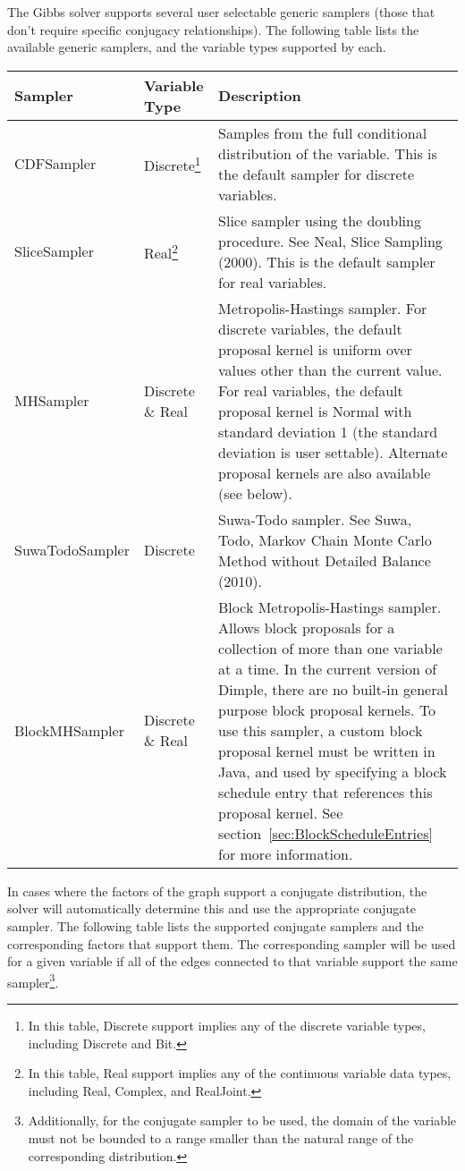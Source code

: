 The Gibbs solver supports several user selectable generic samplers (those that don't require specific conjugacy relationships).  The following table lists the available generic samplers, and the variable types supported by each.

\begin{longtable} {l l p{8.0cm}}
Sampler & Variable Type &  Description \\
\hline
\endhead
CDFSampler & Discrete\footnote{In this table, Discrete support implies any of the discrete variable types, including Discrete and Bit.} & Samples from the full conditional distribution of the variable.  This is the default sampler for discrete variables. \\
SliceSampler & Real\footnote{In this table, Real support implies any of the continuous variable data types, including Real, Complex, and RealJoint.} & Slice sampler using the doubling procedure.  See Neal, Slice Sampling (2000).  This is the default sampler for real variables. \\
MHSampler & Discrete \& Real & Metropolis-Hastings sampler.  For discrete variables, the default proposal kernel is uniform over values other than the current value.  For real variables, the default proposal kernel is Normal with standard deviation 1 (the standard deviation is user settable).  Alternate proposal kernels are also available (see below). \\
SuwaTodoSampler & Discrete & Suwa-Todo sampler.  See Suwa, Todo, Markov Chain Monte Carlo Method without Detailed Balance (2010). \\
BlockMHSampler & Discrete \& Real & Block Metropolis-Hastings sampler.  Allows block proposals for a collection of more than one variable at a time.  In the current version of Dimple, there are no built-in general purpose block proposal kernels.  To use this sampler, a custom block proposal kernel must be written in Java, and used by specifying a block schedule entry that references this proposal kernel.  See section~\ref{sec:BlockScheduleEntries} for more information.
\end{longtable}


In cases where the factors of the graph support a conjugate distribution, the solver will automatically determine this and use the appropriate conjugate sampler.  The following table lists the supported conjugate samplers and the corresponding factors that support them.  The corresponding sampler will be used for a given variable if all of the edges connected to that variable support the same sampler\footnote{Additionally, for the conjugate sampler to be used, the domain of the variable must not be bounded to a range smaller than the natural range of the corresponding distribution.}.


